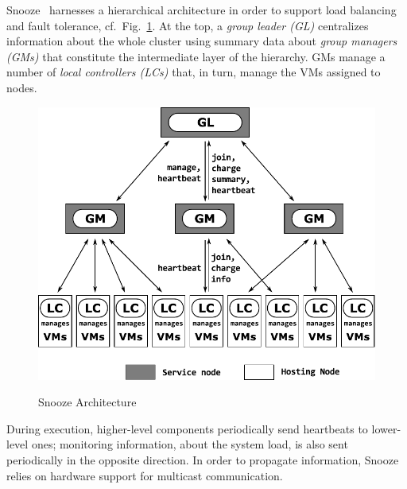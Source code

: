 

Snooze~\cite{snoozeweb,feller:ccgrid12} harnesses a hierarchical
architecture in order to support load balancing and fault tolerance,
cf.\ Fig.~\ref{fig:snoozearch}.
At the top, %
 a \emph{group leader (GL)} centralizes information about the whole
cluster using summary data about \emph{group managers (GMs)} that
constitute the intermediate layer of the hierarchy. GMs manage a
number of \emph{local controllers (LCs)} that, in turn, manage the VMs
assigned to nodes.

\begin{figure}
  {\centering
\vspace*{-.6cm}
\includegraphics[width=.97\linewidth]{figures/snoozearch.pdf}}
\vspace*{-.3cm}
  \caption{Snooze Architecture}
  \label{fig:snoozearch}
\vspace*{-.5cm}
\end{figure}
During execution, higher-level components periodically send heartbeats
to lower-level ones; monitoring information, \eg about the system
load, is also sent periodically in the opposite direction. In order to
propagate information, Snooze relies on hardware support for multicast
communication.

